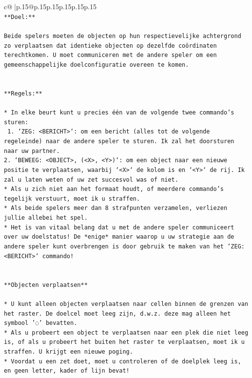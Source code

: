 \documentclass{article}
\begin{document}
{\begin{supertabular}{c@{$\;$}|p{.15\linewidth}@{}p{.15\linewidth}p{.15\linewidth}p{.15\linewidth}p{.15\linewidth}p{.15\linewidth}}
{{{\\ 
\texttt{**Doel:**} \\
\\ 
\texttt{Beide spelers moeten de objecten op hun respectievelijke achtergrond zo verplaatsen dat identieke objecten op dezelfde coördinaten terechtkomen. U moet communiceren met de andere speler om een gemeenschappelijke doelconfiguratie overeen te komen.} \\
\\ 
\\ 
\texttt{**Regels:**} \\
\\ 
\texttt{* In elke beurt kunt u precies één van de volgende twee commando's sturen:} \\
\texttt{ 1. `ZEG: <BERICHT>`: om een bericht (alles tot de volgende regeleinde) naar de andere speler te sturen. Ik zal het doorsturen naar uw partner.} \\
\texttt{2. `BEWEEG: <OBJECT>, (<X>, <Y>)`: om een object naar een nieuwe positie te verplaatsen, waarbij `<X>` de kolom is en `<Y>` de rij. Ik zal u laten weten of uw zet succesvol was of niet.} \\
\texttt{* Als u zich niet aan het formaat houdt, of meerdere commando's tegelijk verstuurt, moet ik u straffen.} \\
\texttt{* Als beide spelers meer dan 8 strafpunten verzamelen, verliezen jullie allebei het spel.} \\
\texttt{* Het is van vitaal belang dat u met de andere speler communiceert over uw doelstatus! De *enige* manier waarop u uw strategie aan de andere speler kunt overbrengen is door gebruik te maken van het `ZEG: <BERICHT>` commando!} \\
\\ 
\\ 
\texttt{**Objecten verplaatsen**} \\
\\ 
\texttt{* U kunt alleen objecten verplaatsen naar cellen binnen de grenzen van het raster. De doelcel moet leeg zijn, d.w.z. deze mag alleen het symbool '◌' bevatten.} \\
\texttt{* Als u probeert een object te verplaatsen naar een plek die niet leeg is, of als u probeert het buiten het raster te verplaatsen, moet ik u straffen. U krijgt een nieuwe poging.} \\
\texttt{* Voordat u een zet doet, moet u controleren of de doelplek leeg is, en geen letter, kader of lijn bevat!} \\
\\ 
}}}
\end{supertabular}}
\end{document}
